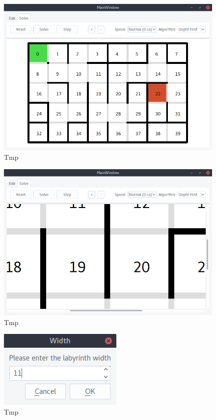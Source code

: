 \documentclass[12pt,a4paper]{article}
\begin{document}
	\begin{figure}[H]
		\centering
		\includegraphics[width=0.8\linewidth]{obrazki/12.png}
		\caption{Tmp}
	\end{figure}
	
	\begin{figure}[H]
		\centering
		\includegraphics[width=0.8\linewidth]{obrazki/13.png}
		\caption{Tmp}
	\end{figure}
	
	\begin{figure}[H]
		\centering
		\includegraphics[width=0.8\linewidth]{obrazki/14.png}
		\caption{Tmp}
	\end{figure}
	
\end{document}
